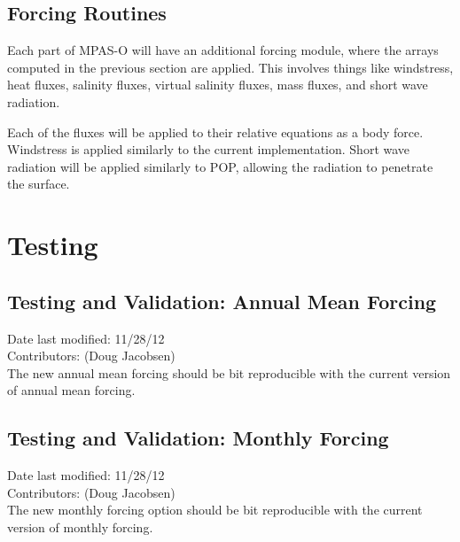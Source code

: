 \documentclass[11pt]{report}
\begin{document}
\section{Forcing Routines}

Each part of MPAS-O will have an additional forcing module, where the arrays computed in the previous section are applied. This involves things like windstress, heat fluxes, salinity fluxes, virtual salinity fluxes, mass fluxes, and short wave radiation.

Each of the fluxes will be applied to their relative equations as a body force. Windstress is applied similarly to the current implementation. Short wave radiation will be applied similarly to POP, allowing the radiation to penetrate the surface.

\chapter{Testing}

\section{Testing and Validation: Annual Mean Forcing}
Date last modified: 11/28/12 \\
Contributors: (Doug Jacobsen) \\

The new annual mean forcing should be bit reproducible with the current version of annual mean forcing.

\section{Testing and Validation: Monthly Forcing}
Date last modified: 11/28/12 \\
Contributors: (Doug Jacobsen) \\

The new monthly forcing option should be bit reproducible with the current version of monthly forcing.


\end{document}

